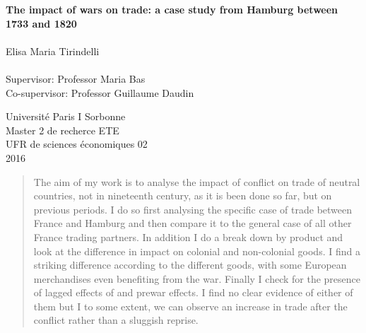 \documentclass[12pt,a4paper,titlepage]{article}
\begin{document}
\begin{titlepage}
\begin{center}
\vspace*{1cm}
 
      \vspace{0.5cm}
		\Large     
         \textbf{The impact of wars on trade: a case study from Hamburg between 1733 and 1820}\\~\\
        \vspace{2cm}
        {Elisa Maria Tirindelli}\\~\\
        {Supervisor: Professor Maria Bas}\\
        {Co-supervisor: Professor Guillaume Daudin}
        
        \vfill
        
        Université Paris I Sorbonne\\
        Master 2 de recherce ETE \\
        UFR de sciences économiques 02\\
        2016
        
\end{center}
\end{titlepage}
\newpage

\begin{abstract}
The aim of my work is to analyse the impact of conflict on trade of neutral countries, not in nineteenth century, as it is been done so far, but on previous periods. I do so first analysing the specific case of trade between France and Hamburg and then compare it to the general case of all other France trading partners. In addition I do a break down by product and look at the difference in impact on colonial and non-colonial goods. I find a striking difference according to the different goods, with some European merchandises even benefiting from the war. Finally I check for the presence of lagged effects of and prewar effects. I find no clear evidence of either of them but I to some extent, we can observe an increase in trade after the conflict rather than a sluggish reprise. 
\end{abstract}
\end{document}
